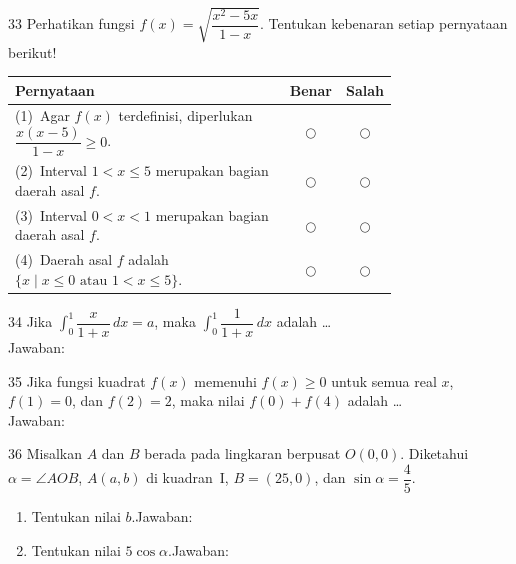 \documentclass[11pt]{article}
\begin{document}
\begin{soal}{33}
Perhatikan fungsi $f(x)=\sqrt{\dfrac{x^2-5x}{1-x}}$.
Tentukan kebenaran setiap pernyataan berikut!

\par\smallskip
{\renewcommand{\arraystretch}{1.4}%
\begin{tabular}{@{}p{0.76\linewidth}cc@{}}
\hline
\textbf{Pernyataan} & \textbf{Benar} & \textbf{Salah}\\
\hline
(1)~Agar $f(x)$ terdefinisi, diperlukan $\dfrac{x(x-5)}{1-x}\geq0$.
  & $\bigcirc$ & $\bigcirc$\\
(2)~Interval $1<x\leq5$ merupakan bagian daerah asal $f$.
  & $\bigcirc$ & $\bigcirc$\\
(3)~Interval $0<x<1$ merupakan bagian daerah asal $f$.
  & $\bigcirc$ & $\bigcirc$\\
(4)~Daerah asal $f$ adalah $\{x\mid x\leq0\text{ atau }1<x\leq5\}$.
  & $\bigcirc$ & $\bigcirc$\\
\hline
\end{tabular}}
\end{soal}

\begin{soal}{34}
Jika $\displaystyle\int_0^1\dfrac{x}{1+x}\,dx=a$, maka
$\displaystyle\int_0^1\dfrac{1}{1+x}\,dx$ adalah \ldots\\[0.4em]
Jawaban:\enspace\underline{\hspace{4cm}}
\end{soal}

\begin{soal}{35}
Jika fungsi kuadrat $f(x)$ memenuhi $f(x)\geq0$ untuk semua real $x$,
$f(1)=0$, dan $f(2)=2$, maka nilai $f(0)+f(4)$ adalah \ldots\\[0.4em]
Jawaban:\enspace\underline{\hspace{4cm}}
\end{soal}

\begin{soal}{36}
Misalkan $A$ dan $B$ berada pada lingkaran berpusat $O(0,0)$.
Diketahui $\alpha=\angle AOB$, $A(a,b)$ di kuadran~I, $B=(25,0)$,
dan $\sin\alpha=\dfrac{4}{5}$.
\begin{enumerate}[label=(\alph*),leftmargin=*,topsep=3pt,itemsep=4pt]
  \item Tentukan nilai $b$.\hfill Jawaban:\enspace\underline{\hspace{3.5cm}}
  \item Tentukan nilai $5\cos\alpha$.\hfill Jawaban:\enspace\underline{\hspace{3.5cm}}
\end{enumerate}
\end{soal}
\end{document}
